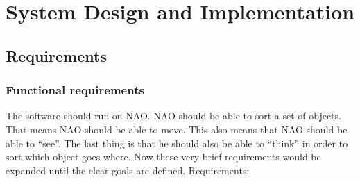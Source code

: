 \section{System Design and Implementation}
\subsection{Requirements}
        \subsubsection{Functional requirements}
            The software should run on NAO. NAO should be able to sort a set of objects. That means NAO should be able to move. This also means that NAO should be able to ``see''. The last thing is that he should also be able to ``think'' in order to sort which object goes where. Now these very brief requirements would be expanded until the clear goals are defined. 
            Requirements:
